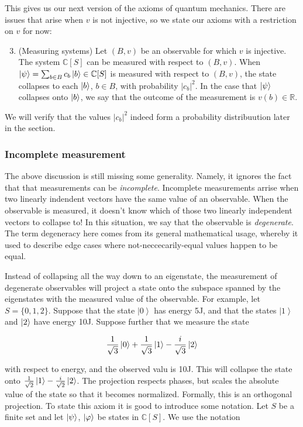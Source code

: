 \documentclass{article}
\theoremstyle{definition}
\newcommand{\RR}{\mathbb{R}}
\newcommand{\CC}{\mathbb{C}}
\newcommand{\0}{\left|0\right>}
\newcommand{\1}{\left|1\right>}
\numberwithin{figure}{section}
\begin{document}
This gives us our next version of the axioms of quantum mechanics. There are issues that arise when $v$ is not injective, so we state our axioms with a restriction on $v$ for now:

\begin{enumerate}[1'.]
\setcounter{enumi}{2}

\item (Measuring systems) Let $(B,v)$ be an observable for which $v$ is injective. The system $\CC[S]$ can be measured with respect to $(B,v)$. When $\ket{\psi} = \sum_{b\in B} c_b \ket{b}\in \CC[S]$ is measured with respect to $(B,v)$, the state collapses to each $\ket{b}$, $b\in B$, with probability $|c_b|^2$. In the case that $\ket{\psi}$ collapses onto $\ket{b}$, we say that the outcome of the measurement is $v(b)\in \RR$.
\end{enumerate}


We will verify that the values $|c_b|^2$ indeed form a probability distribuution later in the section.

\subsubsection{Incomplete measurement}

The above discussion is still missing some generality. Namely, it ignores the fact that that measurements can be \textit{incomplete}. Incomplete measurements arrise when two linearly indendent vectors have the same value of an observable. When the observable is measured, it doesn't know which of those two linearly independent vectors to collapse to! In this situation, we say that the observable is \textit{degenerate}. The term degeneracy here comes from its general mathematical usage, whereby it used to describe edge cases where not-neccecarily-equal values happen to be equal.

Instead of collapsing all the way down to an eigenstate, the measurement of degenerate observables will project a state onto the subspace spanned by the eigenstates with the measured value of the observable. For example, let $S=\{0,1,2\}$. Suppose that the state $\0$ has energy 5J, and that the states $\1$ and $\ket{2}$ have energy 10J. Suppose further that we measure the state

$$\frac{1}{\sqrt{3}}\0+\frac{1}{\sqrt{3}}\1-\frac{i}{\sqrt{3}}\ket{2}$$

with respect to energy, and the observed valu is 10J. This will collapse the state onto $\frac{1}{\sqrt{2}}\1-\frac{i}{\sqrt{2}}\ket{2}$. The projection respects phases, but scales the absolute value of the state so that it becomes normalized. Formally, this is an orthogonal projection. To state this axiom it is good to introduce some notation. Let $S$ be a finite set and let $\ket{\psi}$, $\ket{\varphi}$ be states in $\CC[S]$. We use the notation
\end{document}
